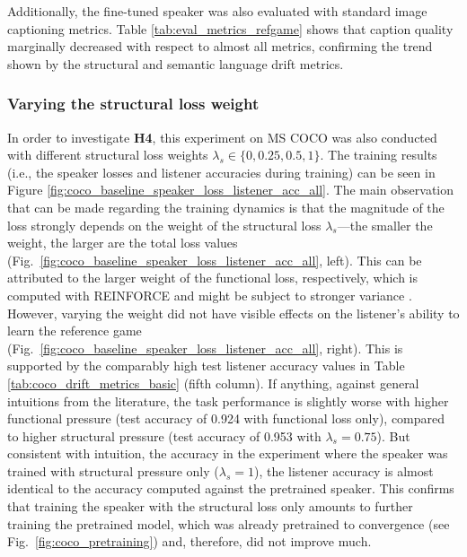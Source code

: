 Additionally, the fine-tuned speaker was also evaluated with standard image captioning metrics. Table \ref{tab:eval_metrics_refgame} shows that caption quality marginally decreased with respect to almost all metrics, confirming the trend shown by the structural and semantic language drift metrics. 

\subsubsection{Varying the structural loss weight}
In order to investigate \textbf{H4}, this experiment on MS COCO was also conducted with different structural loss weights $\lambda_s \in \{0, 0.25, 0.5, 1\}$. The training results (i.e., the speaker losses and listener accuracies during training) can be seen in Figure \ref{fig:coco_baseline_speaker_loss_listener_acc_all}. The main observation that can be made regarding the training dynamics is that the magnitude of the loss strongly depends on the weight of the structural loss $\lambda_s$---the smaller the weight, the larger are the total loss values (Fig.~\ref{fig:coco_baseline_speaker_loss_listener_acc_all}, left). This can be attributed to the larger weight of the functional loss, respectively, which is computed with REINFORCE and might be subject to stronger variance \parencite[cf.][]{havrylov2017emergence}. However, varying the weight did not have visible effects on the listener's ability to learn the reference game (Fig.~\ref{fig:coco_baseline_speaker_loss_listener_acc_all}, right). 
This is supported by the comparably high test listener accuracy values in Table \ref{tab:coco_drift_metrics_basic} (fifth column). If anything, against general intuitions from the literature, the task performance is slightly worse with higher functional pressure (test accuracy of 0.924 with functional loss only), compared to higher structural pressure (test accuracy of 0.953 with $\lambda_s = 0.75$). But consistent with intuition, the accuracy in the experiment where the speaker was trained with structural pressure only ($\lambda_s = 1$), the listener accuracy is almost identical to the accuracy computed against the pretrained speaker. This confirms that training the speaker with the structural loss only amounts to further training the pretrained model, which was already pretrained to convergence (see Fig.~\ref{fig:coco_pretraining}) and, therefore, did not improve much.

